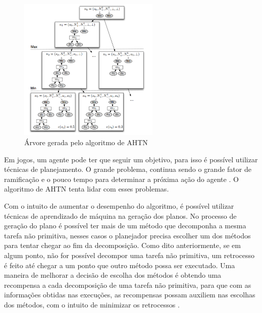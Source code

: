 \begin{figure}[ht]
	\centering
	\includegraphics[width=0.6\textwidth]{fig/ahtn.pdf}
	\caption{Árvore gerada pelo algoritmo de AHTN}
	\label{fig:ahtn}
\end{figure}

Em jogos, um agente pode ter que seguir um objetivo, para isso é possível utilizar técnicas de planejamento. O grande problema, continua sendo o grande fator de ramificação e o pouco tempo para determinar a próxima ação do agente \cite{}. O algoritmo de AHTN tenta lidar com esses problemas. 

Com o intuito de aumentar o desempenho do algoritmo, é possível utilizar técnicas de aprendizado de máquina na geração dos planos. No processo de geração do plano é possível ter mais de um método que decomponha a mesma tarefa não primitiva, nesses casos o planejador precisa escolher um dos métodos para tentar chegar ao fim da decomposição. Como dito anteriormente, se em algum ponto, não for possível decompor uma tarefa não primitiva, um retrocesso é feito até chegar a um ponto que outro método possa ser executado. Uma maneira de melhorar a decisão de escolha dos métodos é obtendo uma recompensa a cada decomposição de uma tarefa não primitiva, para que com as informações obtidas nas execuções, as recompensas possam auxiliem nas escolhas dos métodos, com o intuito de minimizar os retrocessos \cite{hogg2010learning}. 